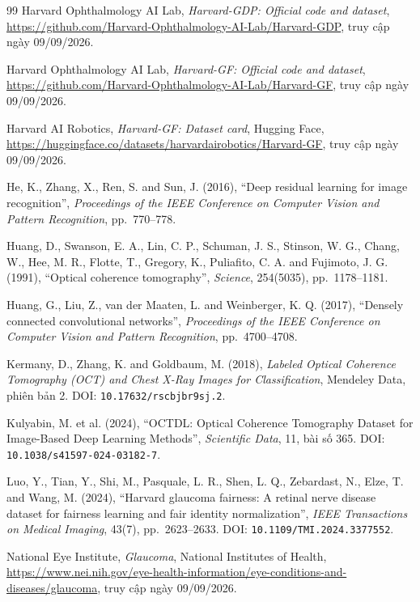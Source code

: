 \documentclass[14pt,a4paper,oneside]{extreport}
\begin{document}
\begin{thebibliography}{99}
Harvard Ophthalmology AI Lab, \textit{Harvard-GDP: Official code and dataset},
\url{https://github.com/Harvard-Ophthalmology-AI-Lab/Harvard-GDP},
truy cập ngày 09/09/2026.

Harvard Ophthalmology AI Lab, \textit{Harvard-GF: Official code and dataset},
\url{https://github.com/Harvard-Ophthalmology-AI-Lab/Harvard-GF},
truy cập ngày 09/09/2026.

Harvard AI Robotics, \textit{Harvard-GF: Dataset card}, Hugging Face,
\url{https://huggingface.co/datasets/harvardairobotics/Harvard-GF},
truy cập ngày 09/09/2026.

He, K., Zhang, X., Ren, S. and Sun, J. (2016), ``Deep residual learning for image
recognition'', \textit{Proceedings of the IEEE Conference on Computer Vision
and Pattern Recognition}, pp.~770--778.

Huang, D., Swanson, E. A., Lin, C. P., Schuman, J. S., Stinson, W. G.,
Chang, W., Hee, M. R., Flotte, T., Gregory, K., Puliafito, C. A. and
Fujimoto, J. G. (1991), ``Optical coherence tomography'',
\textit{Science}, 254(5035), pp.~1178--1181.

Huang, G., Liu, Z., van der Maaten, L. and Weinberger, K. Q. (2017), ``Densely
connected convolutional networks'', \textit{Proceedings of the IEEE Conference
on Computer Vision and Pattern Recognition}, pp.~4700--4708.

Kermany, D., Zhang, K. and Goldbaum, M. (2018),
\textit{Labeled Optical Coherence Tomography (OCT) and Chest X-Ray Images
for Classification}, Mendeley Data, phiên bản 2.
DOI: \nolinkurl{10.17632/rscbjbr9sj.2}.

Kulyabin, M. et al. (2024), ``OCTDL: Optical Coherence Tomography Dataset
for Image-Based Deep Learning Methods'', \textit{Scientific Data},
11, bài số 365. DOI: \nolinkurl{10.1038/s41597-024-03182-7}.

Luo, Y., Tian, Y., Shi, M., Pasquale, L. R., Shen, L. Q., Zebardast, N.,
Elze, T. and Wang, M. (2024), ``Harvard glaucoma fairness: A retinal nerve
disease dataset for fairness learning and fair identity normalization'',
\textit{IEEE Transactions on Medical Imaging}, 43(7), pp.~2623--2633.
DOI: \nolinkurl{10.1109/TMI.2024.3377552}.

National Eye Institute, \textit{Glaucoma}, National Institutes of Health,
\url{https://www.nei.nih.gov/eye-health-information/eye-conditions-and-diseases/glaucoma},
truy cập ngày 09/09/2026.


\end{thebibliography}
\end{document}
